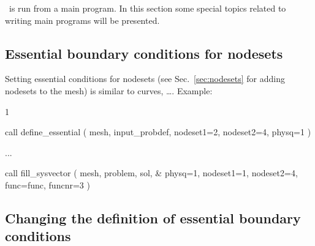 \tfem\ is run from a main program. In this section some special topics related
to writing main programs will be presented.

\subsection{Essential boundary conditions for nodesets}
\label{sec:essnodeset}

Setting essential conditions for nodesets (see Sec.~\ref{sec:nodesets} for
adding nodesets to the mesh) is similar to curves, \ldots.
Example:
\begin{listing}{1}

  call define_essential ( mesh, input_probdef, nodeset1=2, nodeset2=4, physq=1 )

  ...

  call fill_sysvector ( mesh, problem, sol, &
    physq=1, nodeset1=1, nodeset2=4, func=func, funcnr=3 )

\end{listing}

\subsection{Changing the definition of essential boundary conditions}


